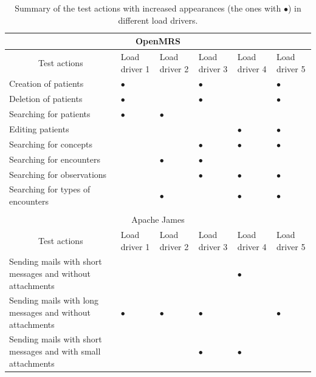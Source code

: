 \begin{table}[htbp]
  \centering
  \tiny
  \caption{Summary of the test actions with increased appearances (the ones with $\bullet$) in different load drivers.}
    \begin{tabular}{|m{16em}<{\centering}|m{4em}<{\centering}|m{4em}<{\centering}|m{4em}<{\centering}|m{4em}<{\centering}|m{4em}<{\centering}|}
    \hline
    \multicolumn{6}{|c|}{OpenMRS} \\
    \hline
    \multicolumn{1}{|c|}{Test actions} & Load driver 1 & Load driver 2 & Load driver 3 & Load driver 4 & Load driver 5 \\
    \hline
    Creation of patients & $\bullet$   &       & $\bullet$   &       & $\bullet$ \\
    \hline
    Deletion of patients & $\bullet$   &       & $\bullet$   &       & $\bullet$ \\
    \hline
    Searching for patients & $\bullet$   & $\bullet$   &       &       &  \\
    \hline
    Editing patients &       &       &       & $\bullet$   & $\bullet$ \\
    \hline
    Searching for concepts &       &       & $\bullet$   & $\bullet$   & $\bullet$ \\
    \hline
    Searching for encounters &       & $\bullet$   & $\bullet$   &       &  \\
    \hline
    Searching for observations &       &       & $\bullet$   & $\bullet$   & $\bullet$ \\
    \hline
    Searching for types of encounters &       & $\bullet$   &       & $\bullet$   & $\bullet$ \\
    \hline
    \multicolumn{6}{c}{} \\
    \hline
    \multicolumn{6}{|c|}{Apache James} \\
    \hline
    \multicolumn{1}{|c|}{Test actions} & Load driver 1 & Load driver 2 & Load driver 3 & Load driver 4 & Load driver 5 \\
    \hline
    Sending mails with short messages and without attachments &       &       &       & $\bullet$   &  \\
    \hline
    Sending mails with long messages and without attachments & $\bullet$   & $\bullet$   & $\bullet$   &       & $\bullet$ \\
    \hline
    Sending mails with short messages and with small attachments &       &       & $\bullet$   & $\bullet$   &  \\

\end{tabular}
\end{table}
